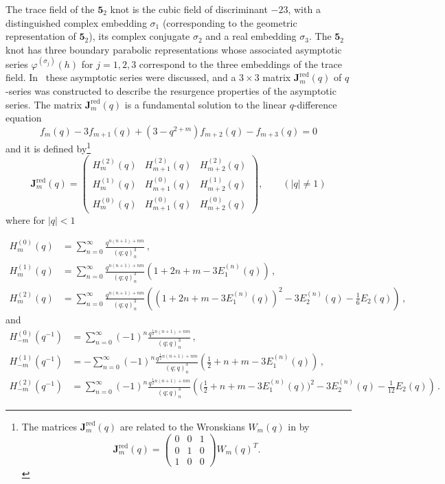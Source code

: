 \documentclass[12pt,reqno]{amsart}
\theoremstyle{definition}
\def\s{\sigma}
\def\be{\begin{equation}}
\def\ee{\end{equation}}
\def\bJ{\mathbf J}
\def\RED{\mathrm{red}}
\def\md{\mathbf}
\newcommand{\knot}[1]{\md{#1}}
\begin{document}
The trace field of the $\knot{5}_2$ knot is the cubic field of discriminant $-23$,
with a distinguished complex embedding $\s_1$ (corresponding to the geometric
representation of $\knot{5}_2$), its complex conjugate $\s_2$ and a real embedding $\s_3$.
The $\knot{5}_2$ knot has three boundary parabolic representations whose associated
asymptotic series $\varphi^{(\s_j)}(h)$ for $j=1,2,3$ correspond to the three
embeddings of the trace field. In~\cite{GGM:resurgent} these asymptotic series
were discussed, and a $3 \times 3$ matrix $\bJ^\RED_m(q)$ of $q$-series was constructed
to describe the resurgence properties of the asymptotic series. The matrix 
$\bJ^\RED_m(q)$ is a fundamental solution to the linear $q$-difference
equation~\cite[Eqn.(23)]{GGM:resurgent}
\begin{equation}
  \label{52qdiff}
  f_m(q)-3f_{m+1}(q)+(3-q^{2+m})f_{m+2}(q) - f_{m+3}(q) = 0
\end{equation}
and it is defined by\footnote{The matrices $\bJ^\RED_m(q)$ are related to the
  Wronskians $W_m(q)$ in \cite{GGM:resurgent,GGM:peacock} by
  \begin{equation}
    \bJ^\RED_m(q) =
    \begin{pmatrix}
      0&0&1\\0&1&0\\1&0&0
    \end{pmatrix} W_m(q)^T.
  \end{equation}}
\be
\label{Jqred52}
\bJ^\RED_{m}(q) =
\begin{pmatrix}
H_{m}^{(2)}(q) & H_{m+1}^{(2)}(q) & H_{m+2}^{(2)}(q) \\
H_{m}^{(1)}(q) & H_{m+1}^{(0)}(q) & H_{m+2}^{(1)}(q) \\
H_{m}^{(0)}(q) & H_{m+1}^{(0)}(q) & H_{m+2}^{(0)}(q) 
\end{pmatrix},
\qquad (|q| \neq 1)
\ee
where for $|q|<1$

\be
\label{Hpm}
\begin{aligned}
H^{(0)}_{m}(q)
  &=\sum_{n=0}^\infty \frac{q^{n(n+1)+nm}}{(q;q)_n^3}\,,
\\
  H^{(1)}_{m}(q)
  &=\sum_{n=0}^\infty \frac{q^{n(n+1)+nm}}{(q;q)_n^3}
    \left(1+2n+m-3E_1^{(n)}(q)\right) \,,
  \\
  H^{(2)}_{m}(q)
  &=\sum_{n=0}^\infty \frac{q^{n(n+1)+nm}}{(q;q)_n^3}
    \left((1+2n+m-3E_1^{(n)}(q))^2-3E_2^{(n)}(q)-\frac{1}{6}E_2(q)\right) \,,
\end{aligned}
\ee
and
\be
\label{Hnm}
\begin{aligned}
  H^{(0)}_{-m}(q^{-1})
  &=\sum_{n=0}^\infty (-1)^n\frac{q^{\frac{1}{2}n(n+1)+nm}}{(q;q)_n^3}\,,
\\
  H^{(1)}_{-m}(q^{-1})
  &=-\sum_{n=0}^\infty (-1)^n\frac{q^{\frac{1}{2}n(n+1)+nm}}{(q;q)_n^3}
    \left(\frac{1}{2}+n+m-3E_1^{(n)}(q)\right) \,,
  \\
  H^{(2)}_{-m}(q^{-1})
  &=\sum_{n=0}^\infty (-1)^n\frac{q^{\frac{1}{2}n(n+1)+nm}}{(q;q)_n^3}
  \left(\big(\frac{1}{2}+n+m-3E_1^{(n)}(q)\big)^2-3E_2^{(n)}(q)
    -\frac{1}{12}E_2(q)\right) \,.
\end{aligned}
\ee
\end{document}
